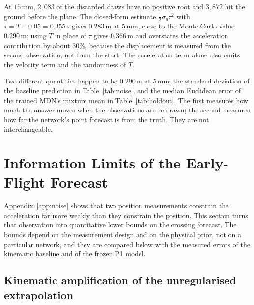 \documentclass[11pt,a4paper]{article}
\begin{document}
At $15\,\mathrm{mm}$, $2{,}083$ of the discarded draws have no positive root and $3{,}872$ hit the ground before the plane. The closed-form estimate $\tfrac12\sigma_a\tau^{2}$ with $\tau=T-0.05=0.355\,\mathrm{s}$ gives $0.283\,\mathrm{m}$ at $5\,\mathrm{mm}$, close to the Monte-Carlo value $0.290\,\mathrm{m}$; using $T$ in place of $\tau$ gives $0.366\,\mathrm{m}$ and overstates the acceleration contribution by about $30\%$, because the displacement is measured from the second observation, not from the start. The acceleration term alone also omits the velocity term and the randomness of $T$.

Two different quantities happen to be $0.290\,\mathrm{m}$ at $5\,\mathrm{mm}$: the standard deviation of the baseline prediction in Table~\ref{tab:noise}, and the median Euclidean error of the trained MDN's mixture mean in Table~\ref{tab:holdout}. The first measures how much the answer moves when the observations are re-drawn; the second measures how far the network's point forecast is from the truth. They are not interchangeable.

\section{Information Limits of the Early-Flight Forecast}
\label{app:limits}

Appendix~\ref{app:noise} shows that two position measurements constrain the
acceleration far more weakly than they constrain the position. This section turns
that observation into quantitative lower bounds on the crossing forecast. The
bounds depend on the measurement design and on the physical prior, not on a
particular network, and they are compared below with the measured errors of the
kinematic baseline and of the frozen P1 model.

\subsection{Kinematic amplification of the unregularised extrapolation}
\end{document}
